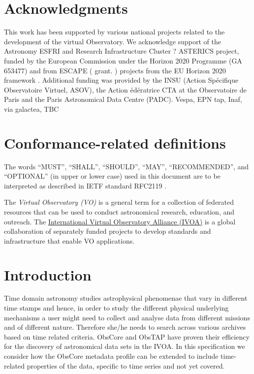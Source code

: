 \documentclass[11pt,a4paper]{ivoa}
\begin{document}
\section*{Acknowledgments}
This work has been supported by various national projects related to the development of the virtual Observatory.
 We acknowledge support of the Astronomy ESFRI and Research Infrastructure Cluster ? ASTERICS project, funded by the European Commission under the Horizon 2020 Programme (GA 653477) and from ESCAPE ( grant. ) projects from the  EU Horizon 2020  framework .
 Additional funding was provided by the INSU (Action Sp\'{e}cifique Observatoire Virtuel, ASOV), the Action \'ed\'eratrice CTA at the Observatoire de Paris and the Paris Astronomical Data Centre (PADC).
Vespa, EPN tap, Inaf, via galactea, TBC
\section*{Conformance-related definitions}

The words ``MUST'', ``SHALL'', ``SHOULD'', ``MAY'', ``RECOMMENDED'', and
``OPTIONAL'' (in upper or lower case) used in this document are to be
interpreted as described in IETF standard RFC2119 \citep{std:RFC2119}.

The \emph{Virtual Observatory (VO)} is a
general term for a collection of federated resources that can be used
to conduct astronomical research, education, and outreach.
The \href{https://www.ivoa.net}{International
Virtual Observatory Alliance (IVOA)} is a global
collaboration of separately funded projects to develop standards and
infrastructure that enable VO applications.


\section{Introduction}

Time domain astronomy studies astrophysical phenomenae that vary in different time stamps and hence, in order to study the different physical underlying mechanisms a user might need to collect and analyse data from different missions and of different nature. Therefore she/he needs to search across various archives based on time related criteria.
ObsCore and ObsTAP  \cite{2017ivoa.spec.0509L} have proven their efficiency for the discovery of astronomical data sets in the IVOA. 
In this specification we consider how the ObsCore metadata profile can be extended to include time-related properties of the data, specific to time series and not yet covered.
\end{document}

